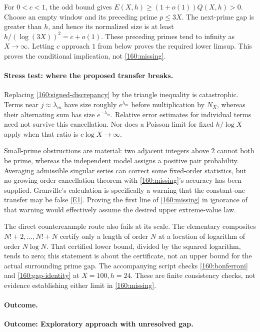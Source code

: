\documentclass[11pt,a4paper]{article}
\newcommand{\eref}[2]{\hyperlink{extra:#1:#2}{[E#2]}}
\numberwithin{equation}{section}
\begin{document}
For $0<c<1$, the odd bound gives
$E(X,h)\ge(1+o(1))Q(X,h)>0$. Choose an empty window and its preceding
prime $p\le3X$. The next-prime gap is greater than $h$, and hence its
normalized size is at least
$h/(\log(3X))^2=c+o(1)$. These preceding primes tend to infinity as
$X\to\infty$. Letting $c$ approach $1$ from below proves the required
lower limsup. This proves the conditional implication, not
\eqref{160:missing}.

\paragraph{Stress test: where the proposed transfer breaks.}
Replacing \eqref{160:signed-discrepancy} by the triangle inequality is
catastrophic. Terms near $j\approx\lambda_m$ have size roughly
$e^{\lambda_m}$ before multiplication by $N_X$, whereas their alternating
sum has size $e^{-\lambda_m}$. Relative error estimates for individual
terms need not survive this cancellation. Nor does a Poisson limit for
fixed $h/\log X$ apply when that ratio is $c\log X\to\infty$.

Small-prime obstructions are material: two adjacent integers above $2$
cannot both be prime, whereas the independent model assigns a positive
pair probability. Averaging admissible singular series can correct some
fixed-order statistics, but no growing-order cancellation theorem with
\eqref{160:missing}'s accuracy has been supplied. Granville's calculation
is specifically a warning that the constant-one transfer may be false
\eref{160}{1}. Proving the first line of \eqref{160:missing} in ignorance
of that warning would effectively assume the desired upper extreme-value
law.

The direct counterexample route also fails at its scale. The elementary
composites $N!+2,\ldots,N!+N$ certify only a length of order $N$ at a
location of logarithm of order $N\log N$. That certified lower bound,
divided by the squared logarithm, tends to zero; this statement is about
the certificate, not an upper bound for the actual surrounding prime gap.
The accompanying script checks \eqref{160:bonferroni} and
\eqref{160:gap-identity} at $X=100,h=24$. These are finite consistency
checks, not evidence establishing either limit in \eqref{160:missing}.

\paragraph{Outcome.}
\textbf{Outcome: Exploratory approach with unresolved gap.}
\end{document}
